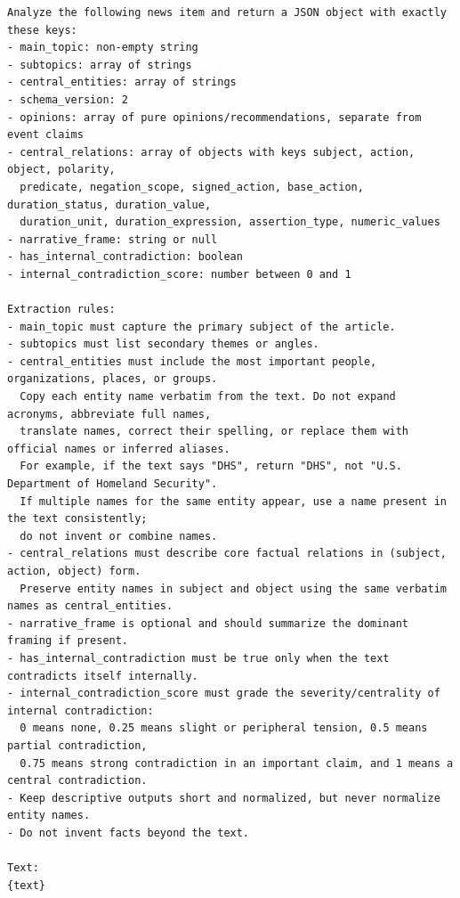 \begin{lstlisting}[title={Mensagem de extração estrutural}]
Analyze the following news item and return a JSON object with exactly these keys:
- main_topic: non-empty string
- subtopics: array of strings
- central_entities: array of strings
- schema_version: 2
- opinions: array of pure opinions/recommendations, separate from event claims
- central_relations: array of objects with keys subject, action, object, polarity,
  predicate, negation_scope, signed_action, base_action, duration_status, duration_value,
  duration_unit, duration_expression, assertion_type, numeric_values
- narrative_frame: string or null
- has_internal_contradiction: boolean
- internal_contradiction_score: number between 0 and 1

Extraction rules:
- main_topic must capture the primary subject of the article.
- subtopics must list secondary themes or angles.
- central_entities must include the most important people, organizations, places, or groups.
  Copy each entity name verbatim from the text. Do not expand acronyms, abbreviate full names,
  translate names, correct their spelling, or replace them with official names or inferred aliases.
  For example, if the text says "DHS", return "DHS", not "U.S. Department of Homeland Security".
  If multiple names for the same entity appear, use a name present in the text consistently;
  do not invent or combine names.
- central_relations must describe core factual relations in (subject, action, object) form.
  Preserve entity names in subject and object using the same verbatim names as central_entities.
- narrative_frame is optional and should summarize the dominant framing if present.
- has_internal_contradiction must be true only when the text contradicts itself internally.
- internal_contradiction_score must grade the severity/centrality of internal contradiction:
  0 means none, 0.25 means slight or peripheral tension, 0.5 means partial contradiction,
  0.75 means strong contradiction in an important claim, and 1 means a central contradiction.
- Keep descriptive outputs short and normalized, but never normalize entity names.
- Do not invent facts beyond the text.

Text:
{text}


\end{lstlisting}
